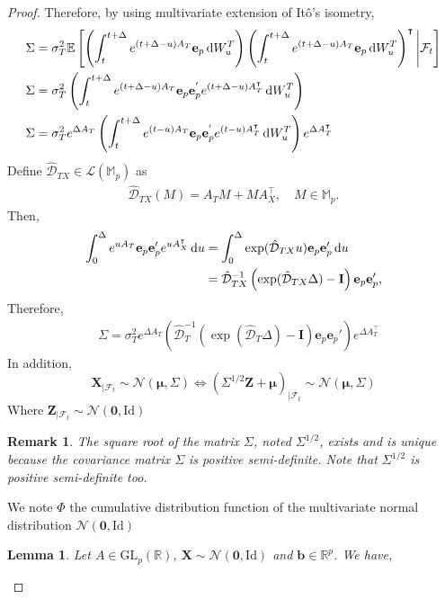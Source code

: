 \documentclass[10pt,a4paper,reqno]{amsart}
\newtheorem{lemma}[theorem]{Lemma}
\newtheorem{remark}[theorem]{Remark}
\theoremstyle{example}
\newcommand{\Id}{\mathrm{Id}}
\newcommand*\D{\mathop{}\!\textnormal{d}}
\newcommand{\opI}{\mathbf{I}}
\newcommand{\ME}{\mathbb{E}}
\newcommand{\MM}{\mathbb{M}}
\newcommand{\cL}{\mathcal{L}}
\begin{document}
\begin{proof}
\noindent
Therefore, by using multivariate extension of Itô's isometry,
\begin{align}
    &\Sigma=\sigma_T^2 \ME\left[\left(\int_t^{t+\Delta}e^{(t+\Delta-u)A_T}\textbf{e}_p\D W_u^T\right)\left(\int_t^{t+\Delta}e^{(t+\Delta-u)A_T}\textbf{e}_p\D W_u^T\right)^\intercal \Bigg| \mathcal{F}_t\right]\nonumber\\
    &\Sigma = \sigma_T^2\left(\int_t^{t+\Delta}e^{(t+\Delta-u)A_T}\textbf{e}_p\textbf{e}_p^{'}e^{(t+\Delta-u)A_T^{\intercal}} \D W_u^T\right)\nonumber\\
    &\Sigma = \sigma_T^2e^{\Delta A_T}\left(\int_t^{t+\Delta}e^{(t-u)A_T}\textbf{e}_p\textbf{e}_p^{'}e^{(t-u)A_T^{\intercal}} \D W_u^T\right)e^{\Delta A_T^\intercal}\nonumber
\end{align}
\noindent
Define $\hat{\mathcal{D}}_{TX}\in\cL(\MM_p)$ as
\begin{align*}
    \hat{\mathcal{D}}_{TX}(M)=A_TM+MA_{X}^{\intercal},\quad M\in\MM_p.
\end{align*}
Then, 
\begin{align*}
\int_0^{\Delta}e^{uA_{T}}\textbf{e}_p \textbf{e}_p'e^{uA_X^\intercal}\D u&=\int_0^{\Delta}\exp(\hat{\mathcal{D}}_{TX}u)\textbf{e}_p \textbf{e}_p'\D u\\
&=\hat{\mathcal{D}}_{TX}^{-1}\left(\exp(\hat{\mathcal{D}}_{TX}\Delta)-\opI\right)\textbf{e}_p \textbf{e}_p',
\end{align*}
\noindent
Therefore,
\begin{align}
    &\Sigma = \sigma_T^2e^{\Delta A_T}\left(\hat{\mathcal{D}}_{T}^{-1}\left(\exp(\hat{\mathcal{D}}_{T}\Delta)-\opI\right)\textbf{e}_p \textbf{e}_p'
    \right)e^{\Delta A_T^\intercal}
\end{align}
In addition,
$$
\textbf{X}_{|\mathcal{F}_t} \sim \mathcal{N}(\boldsymbol{\mu},\Sigma) \iff (\Sigma^{1/2}\mathbf{Z}+\boldsymbol{\mu})_{|\mathcal{F}_t} \sim \mathcal{N}(\boldsymbol{\mu},\Sigma) 
$$
\newline
Where $\mathbf{Z}_{|\mathcal{F}_t}\sim\mathcal{N}(\mathbf{0},\Id)$
\begin{remark}
    The square root of the matrix $\Sigma$, noted $\Sigma^{1/2}$, exists and is unique because the covariance matrix $\Sigma$ is positive semi-definite. Note that $\Sigma^{1/2}$ is positive semi-definite too.
\end{remark}
\noindent
We note $\Phi$ the cumulative distribution function of the multivariate normal distribution $\mathcal{N}(\textbf{0},\Id)$
\begin{lemma}
   Let $A\in\text{GL}_p(\mathbb{R})$, $\textbf{X}\sim\mathcal{N}(\textbf{0},\Id)$ and $\mathbf{b}\in\mathbb{R}^p$. We have,

\end{lemma}
\end{proof}
\end{document}
